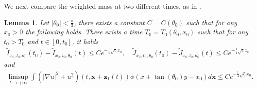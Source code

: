 \documentclass[reqno,10pt]{amsart}
\newtheorem{lemm}{Lemma}[section]
\numberwithin{equation}{section}
\newcommand{\bx}{\mathbf{x}}
\newcommand{\bz}{\mathbf{z}}
\begin{document}
  We next compare the weighted mass at two different times, as in \cite{MMT02,MM05,CMPS16}.
	
		
		\begin{lemm}\label{lemm:monotonicity_2}
			Let $\vert \theta_0 \vert < \frac{\pi}{3}$, there exists a constant $C=C (\theta_0)$ such that for any $x_0>0$ the following holds. There exists a time $T_0=T_0(\theta_0,x_0)$ such that for any $t_0>T_0$ and $t\in [0,t_0]$, it holds
			\begin{align}\label{eq:monotonic_mass2}
				\tilde{I}_{x_0,t_0,\theta_0}(t_0) - \tilde{I}_{x_0,t_0,\theta_0}(t) \leq C e^{-\frac14 \sqrt{\underline{c}} x_0}, \quad \tilde{J}_{x_0,t_0,\theta_0}(t_0) -\tilde{J}_{x_0,t_0,\theta_0}(t) \leq C e^{-\frac14 \sqrt{\underline{c}}x_0}
			\end{align}
			and 
			\begin{align}\label{eq:limsup_T1}
				\limsup_{t\rightarrow +\infty} \int \left( \vert \nabla u \vert^2 + u^2 \right) \left( t, \bx + \bz_1(t) \right) \phi (x + \tan(\theta_0)y - x_0) d\bx \leq C e^{-\frac14\sqrt{\underline{c}} x_0}.
			\end{align}
		\end{lemm}
	
\end{document}
